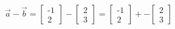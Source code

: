 \documentclass[preview]{standalone}
\begin{document}
\begin{align*}
\vec{a} - \vec{b} = \begin{bmatrix} \text{-}1 \\ 2 \end{bmatrix} - \begin{bmatrix} 2 \\ 3 \end{bmatrix} = \begin{bmatrix} \text{-}1 \\ 2 \end{bmatrix} + - \begin{bmatrix} 2 \\ 3 \end{bmatrix}
\end{align*}
\end{document}
